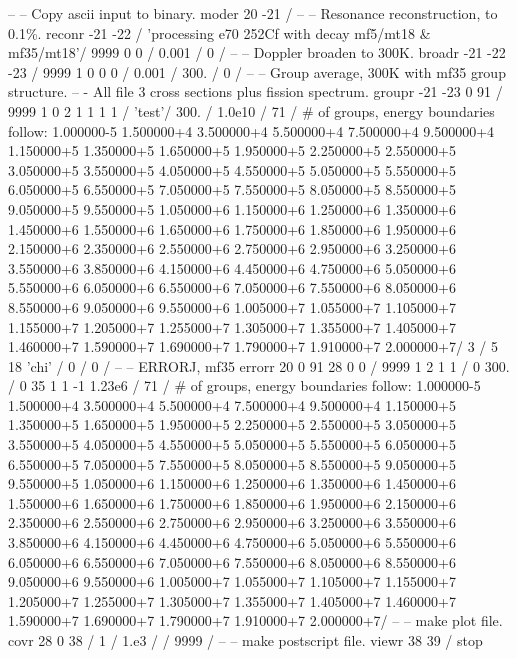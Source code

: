 \small
\begin{ccode}

   --
   -- Copy ascii input to binary.
   moder
    20 -21 /
   --
   -- Resonance reconstruction, to 0.1\%.
   reconr
    -21 -22 /
    'processing e70 252Cf with decay mf5/mt18 & mf35/mt18'/
    9999 0 0 /
    0.001 /
    0 /
   --
   -- Doppler broaden to 300K.
   broadr
    -21 -22 -23 /
    9999 1 0 0 0 /
    0.001 /
    300. /
    0 /
   --
   -- Group average, 300K with mf35 group structure.
   --  - All file 3 cross sections plus fission spectrum.
   groupr
    -21 -23 0 91 /
    9999 1 0 2 1 1 1 1 /
    'test'/
    300. /
    1.0e10 /
    71 / # of groups, energy boundaries follow:
    1.000000-5 1.500000+4 3.500000+4 5.500000+4 7.500000+4
    9.500000+4 1.150000+5 1.350000+5 1.650000+5 1.950000+5
    2.250000+5 2.550000+5 3.050000+5 3.550000+5 4.050000+5
    4.550000+5 5.050000+5 5.550000+5 6.050000+5 6.550000+5
    7.050000+5 7.550000+5 8.050000+5 8.550000+5 9.050000+5
    9.550000+5 1.050000+6 1.150000+6 1.250000+6 1.350000+6
    1.450000+6 1.550000+6 1.650000+6 1.750000+6 1.850000+6
    1.950000+6 2.150000+6 2.350000+6 2.550000+6 2.750000+6
    2.950000+6 3.250000+6 3.550000+6 3.850000+6 4.150000+6
    4.450000+6 4.750000+6 5.050000+6 5.550000+6 6.050000+6
    6.550000+6 7.050000+6 7.550000+6 8.050000+6 8.550000+6
    9.050000+6 9.550000+6 1.005000+7 1.055000+7 1.105000+7
    1.155000+7 1.205000+7 1.255000+7 1.305000+7 1.355000+7
    1.405000+7 1.460000+7 1.590000+7 1.690000+7 1.790000+7
    1.910000+7 2.000000+7/
    3 /
    5 18  'chi' /
    0 /
    0 /
   --
   -- ERRORJ, mf35
   errorr
    20 0 91 28 0 0 /
    9999 1 2 1 1 /
    0 300. /
    0 35 1 1 -1 1.23e6 /
    71 / # of groups, energy boundaries follow:
    1.000000-5 1.500000+4 3.500000+4 5.500000+4 7.500000+4
    9.500000+4 1.150000+5 1.350000+5 1.650000+5 1.950000+5
    2.250000+5 2.550000+5 3.050000+5 3.550000+5 4.050000+5
    4.550000+5 5.050000+5 5.550000+5 6.050000+5 6.550000+5
    7.050000+5 7.550000+5 8.050000+5 8.550000+5 9.050000+5
    9.550000+5 1.050000+6 1.150000+6 1.250000+6 1.350000+6
    1.450000+6 1.550000+6 1.650000+6 1.750000+6 1.850000+6
    1.950000+6 2.150000+6 2.350000+6 2.550000+6 2.750000+6
    2.950000+6 3.250000+6 3.550000+6 3.850000+6 4.150000+6
    4.450000+6 4.750000+6 5.050000+6 5.550000+6 6.050000+6
    6.550000+6 7.050000+6 7.550000+6 8.050000+6 8.550000+6
    9.050000+6 9.550000+6 1.005000+7 1.055000+7 1.105000+7
    1.155000+7 1.205000+7 1.255000+7 1.305000+7 1.355000+7
    1.405000+7 1.460000+7 1.590000+7 1.690000+7 1.790000+7
    1.910000+7 2.000000+7/
   --
   -- make plot file.
   covr
    28 0 38 /
    1 /
    1.e3 /
    /
    9999 /
   --
   -- make postscript file.
   viewr
    38 39 /
   stop
\end{ccode}
\normalsize


